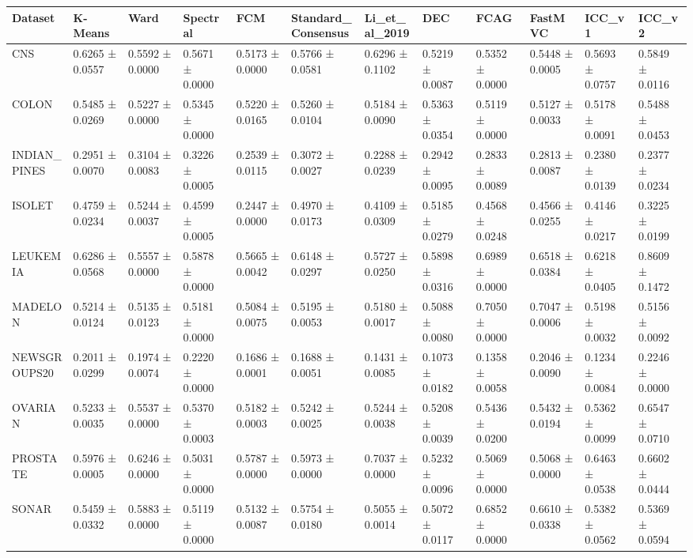 \begin{tabular}{llllllllllll}
\toprule
Dataset & K-Means & Ward & Spectral & FCM & Standard_Consensus & Li_et_al_2019 & DEC & FCAG & FastMVC & ICC_v1 & ICC_v2 \\
\midrule
CNS & 0.6265 ± 0.0557 & 0.5592 ± 0.0000 & 0.5671 ± 0.0000 & 0.5173 ± 0.0000 & 0.5766 ± 0.0581 & 0.6296 ± 0.1102 & 0.5219 ± 0.0087 & 0.5352 ± 0.0000 & 0.5448 ± 0.0005 & 0.5693 ± 0.0757 & 0.5849 ± 0.0116 \\
COLON & 0.5485 ± 0.0269 & 0.5227 ± 0.0000 & 0.5345 ± 0.0000 & 0.5220 ± 0.0165 & 0.5260 ± 0.0104 & 0.5184 ± 0.0090 & 0.5363 ± 0.0354 & 0.5119 ± 0.0000 & 0.5127 ± 0.0033 & 0.5178 ± 0.0091 & 0.5488 ± 0.0453 \\
INDIAN_PINES & 0.2951 ± 0.0070 & 0.3104 ± 0.0083 & 0.3226 ± 0.0005 & 0.2539 ± 0.0115 & 0.3072 ± 0.0027 & 0.2288 ± 0.0239 & 0.2942 ± 0.0095 & 0.2833 ± 0.0089 & 0.2813 ± 0.0087 & 0.2380 ± 0.0139 & 0.2377 ± 0.0234 \\
ISOLET & 0.4759 ± 0.0234 & 0.5244 ± 0.0037 & 0.4599 ± 0.0005 & 0.2447 ± 0.0000 & 0.4970 ± 0.0173 & 0.4109 ± 0.0309 & 0.5185 ± 0.0279 & 0.4568 ± 0.0248 & 0.4566 ± 0.0255 & 0.4146 ± 0.0217 & 0.3225 ± 0.0199 \\
LEUKEMIA & 0.6286 ± 0.0568 & 0.5557 ± 0.0000 & 0.5878 ± 0.0000 & 0.5665 ± 0.0042 & 0.6148 ± 0.0297 & 0.5727 ± 0.0250 & 0.5898 ± 0.0316 & 0.6989 ± 0.0000 & 0.6518 ± 0.0384 & 0.6218 ± 0.0405 & 0.8609 ± 0.1472 \\
MADELON & 0.5214 ± 0.0124 & 0.5135 ± 0.0123 & 0.5181 ± 0.0000 & 0.5084 ± 0.0075 & 0.5195 ± 0.0053 & 0.5180 ± 0.0017 & 0.5088 ± 0.0080 & 0.7050 ± 0.0000 & 0.7047 ± 0.0006 & 0.5198 ± 0.0032 & 0.5156 ± 0.0092 \\
NEWSGROUPS20 & 0.2011 ± 0.0299 & 0.1974 ± 0.0074 & 0.2220 ± 0.0000 & 0.1686 ± 0.0001 & 0.1688 ± 0.0051 & 0.1431 ± 0.0085 & 0.1073 ± 0.0182 & 0.1358 ± 0.0058 & 0.2046 ± 0.0090 & 0.1234 ± 0.0084 & 0.2246 ± 0.0000 \\
OVARIAN & 0.5233 ± 0.0035 & 0.5537 ± 0.0000 & 0.5370 ± 0.0003 & 0.5182 ± 0.0003 & 0.5242 ± 0.0025 & 0.5244 ± 0.0038 & 0.5208 ± 0.0039 & 0.5436 ± 0.0200 & 0.5432 ± 0.0194 & 0.5362 ± 0.0099 & 0.6547 ± 0.0710 \\
PROSTATE & 0.5976 ± 0.0005 & 0.6246 ± 0.0000 & 0.5031 ± 0.0000 & 0.5787 ± 0.0000 & 0.5973 ± 0.0000 & 0.7037 ± 0.0000 & 0.5232 ± 0.0096 & 0.5069 ± 0.0000 & 0.5068 ± 0.0000 & 0.6463 ± 0.0538 & 0.6602 ± 0.0444 \\
SONAR & 0.5459 ± 0.0332 & 0.5883 ± 0.0000 & 0.5119 ± 0.0000 & 0.5132 ± 0.0087 & 0.5754 ± 0.0180 & 0.5055 ± 0.0014 & 0.5072 ± 0.0117 & 0.6852 ± 0.0000 & 0.6610 ± 0.0338 & 0.5382 ± 0.0562 & 0.5369 ± 0.0594 \\

\end{tabular}
